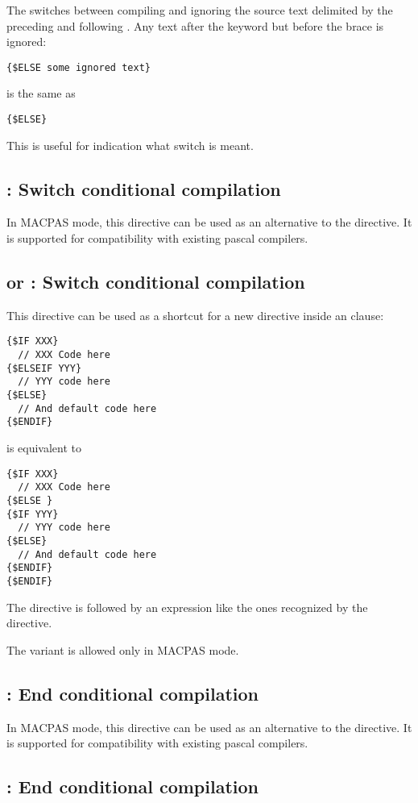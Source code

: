 The  switches between compiling and ignoring the source
text delimited by the preceding  and following
. Any text after the  keyword but before the
brace is ignored:
\begin{verbatim}
{$ELSE some ignored text}
\end{verbatim}
is the same as
\begin{verbatim}
{$ELSE}
\end{verbatim}
This is useful for indication what switch is meant.

\subsection{ : Switch conditional compilation}
In MACPAS mode, this directive can be used as an alternative to the 
directive. It is supported for compatibility with existing \macos pascal
compilers.

\subsection{ or  : Switch conditional compilation}
This directive can be used as a shortcut for a new
 directive inside an  clause:
\begin{verbatim}
{$IF XXX}
  // XXX Code here
{$ELSEIF YYY}
  // YYY code here
{$ELSE}
  // And default code here
{$ENDIF}
\end{verbatim}
is equivalent to
\begin{verbatim}
{$IF XXX}
  // XXX Code here
{$ELSE }
{$IF YYY}
  // YYY code here
{$ELSE}
  // And default code here
{$ENDIF}
{$ENDIF}
\end{verbatim}
The directive is followed by an expression like the ones recognized by the 
 directive.

The  variant is allowed only in MACPAS mode.

\subsection{ : End conditional compilation}
In MACPAS mode, this directive can be used as an alternative to the
 directive. It is supported for compatibility with existing \macos pascal
compilers.

\subsection{ : End conditional compilation}

